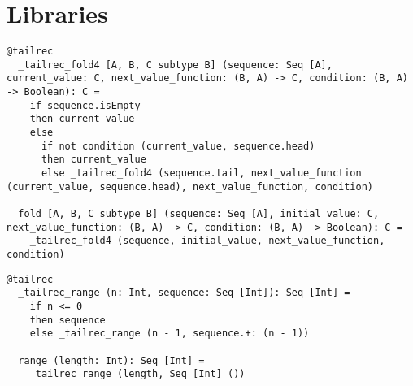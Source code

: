 \chapter{Libraries}

\begin{lstlisting}[label={lst:fold}]
  @tailrec
  _tailrec_fold4 [A, B, C subtype B] (sequence: Seq [A], current_value: C, next_value_function: (B, A) -> C, condition: (B, A) -> Boolean): C =
    if sequence.isEmpty
    then current_value
    else
      if not condition (current_value, sequence.head)
      then current_value
      else _tailrec_fold4 (sequence.tail, next_value_function (current_value, sequence.head), next_value_function, condition)

  fold [A, B, C subtype B] (sequence: Seq [A], initial_value: C, next_value_function: (B, A) -> C, condition: (B, A) -> Boolean): C =
    _tailrec_fold4 (sequence, initial_value, next_value_function, condition)
\end{lstlisting}

\begin{lstlisting}[label={lst:range}]
  @tailrec
  _tailrec_range (n: Int, sequence: Seq [Int]): Seq [Int] =
    if n <= 0
    then sequence
    else _tailrec_range (n - 1, sequence.+: (n - 1))

  range (length: Int): Seq [Int] =
    _tailrec_range (length, Seq [Int] ())
\end{lstlisting}


